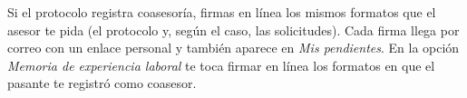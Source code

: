 \documentclass[11pt,a4paper]{article}
\begin{document}
{\small\tableofcontents}
\newpage
\begin{quevasahacer}
Si el protocolo registra coasesoría, firmas en línea los mismos formatos que el asesor te pida (el protocolo y, según el caso, las solicitudes). Cada firma llega por correo con un enlace personal y también aparece en \emph{Mis pendientes}. En la opción \emph{Memoria de experiencia laboral} te toca firmar en línea los formatos en que el pasante te registró como coasesor.
\end{quevasahacer}



\end{document}
